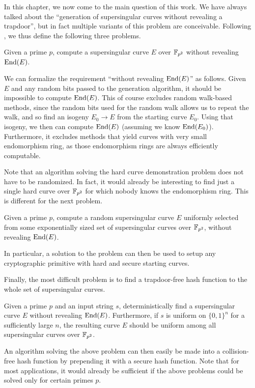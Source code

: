 
In this chapter, we now come to the main question of this work.
We have always talked about the ``generation of supersingular curves without revealing a trapdoor'', but in fact multiple variants of this problem are conceivable.
Following \cite{base_paper}, we thus define the following three problems.
\begin{problem}
    Given a prime $p$, compute a supersingular curve $E$ over $\mathbb{F}_{p^2}$ without revealing $\mathrm{End}(E)$.
\end{problem}
We can formalize the requirement ``without revealing $\mathrm{End}(E)$'' as follows.
Given $E$ and any random bits passed to the generation algorithm, it should be impossible to compute $\mathrm{End}(E)$.
This of course excludes random walk-based methods, since the random bits used for the random walk allows us to repeat the walk, and so find an isogeny $E_0 \to E$ from the starting curve $E_0$.
Using that isogeny, we then can compute $\mathrm{End}(E)$ (assuming we know $\mathrm{End}(E_0)$).
Furthermore, it excludes methods that yield curves with very small endomorphism ring, as those endomorphism rings are always efficiently computable.

Note that an algorithm solving the hard curve demonstration problem does not have to be randomized.
In fact, it would already be interesting to find just a single hard curve over $\mathbb{F}_{p^2}$ for which nobody knows the endomorphism ring.
This is different for the next problem.
\begin{problem}
    Given a prime $p$, compute a random supersingular curve $E$ uniformly selected from some exponentially sized set of supersingular curves over $\mathbb{F}_{p^2}$, without revealing $\mathrm{End}(E)$.
\end{problem}
In particular, a solution to the problem can then be used to setup any cryptographic primitive with hard and secure starting curves.

Finally, the most difficult problem is to find a trapdoor-free hash function to the whole set of supersingular curves.
\begin{problem}
    Given a prime $p$ and an input string $s$, deterministically find a supersingular curve $E$ without revealing $\mathrm{End}(E)$.
    Furthermore, if $s$ is uniform on $\{0, 1\}^n$ for a sufficiently large $n$, the resulting curve $E$ should be uniform among all supersingular curves over $\mathbb{F}_{p^2}$.
\end{problem}
An algorithm solving the above problem can then easily be made into a collision-free hash function by prepending it with a secure hash function.
Note that for most applications, it would already be sufficient if the above problems could be solved only for certain primes $p$. 

